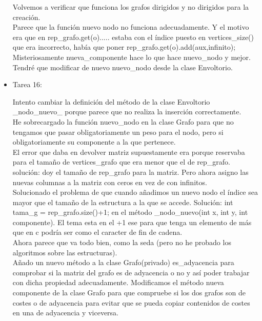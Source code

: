 \begin{itemize}
Volvemos a verificar que funciona los grafos dirigidos y no dirigidos para la creación.\\

Parece que la función nuevo nodo no funciona adecuadamente. Y el motivo era que en rep\_grafo.get(o)..... estaba con el índice puesto en vertices\_size() que era incorrecto, había que poner rep\_grafo.get(o).add(aux,infinito);\\



Misteriosamente nueva\_componente hace lo que hace nuevo\_nodo y mejor. Tendré que modificar de nuevo nuevo\_nodo desde la clase Envoltorio.\\

\item Tarea 16:

Intento cambiar la definición del método de la clase Envoltorio \_nodo\_nuevo\_ porque parece que no realiza la inserción correctamente.\\

He sobrecargado la función nuevo\_nodo en la clase Grafo para que no tengamos que pasar obligatoriamente un peso para el nodo, pero si obligatoriamente su componente a la que pertenece.\\

El error que daba en devolver matriz supuestamente era porque reservaba para el tamaño de vertices\_grafo que era menor que el de rep\_grafo. solución: doy el tamaño de rep\_grafo para la matriz. Pero ahora asigno las nuevas columnas a la matriz con ceros en vez de con infinitos.\\

Solucionado el problema de que cuando añadimos un nuevo nodo el índice sea mayor que el tamaño de la estructura a la que se accede. Solución: int tama\_g = rep\_grafo.size()+1; en el método \_nodo\_nuevo(int x, int y, int componente). El tema esta en el +1 ese para que tenga un elemento de más que en c podría ser como el caracter de fin de cadena. \\

Ahora parece que va todo bien, como la seda (pero no he probado los algoritmos sobre las estructuras).\\

Añado un nuevo método a la clase Grafo(privado) es\_adyacencia para comprobar si la matriz del grafo es de adyacencia o no y así poder trabajar con dicha propiedad adecuadamente. Modificamos el método nueva componente de la clase Grafo para que compruebe si los dos grafos son de costes o de adyacencia para evitar que se pueda copiar contenidos de costes en una de adyacencia y viceversa.\\


\end{itemize}
